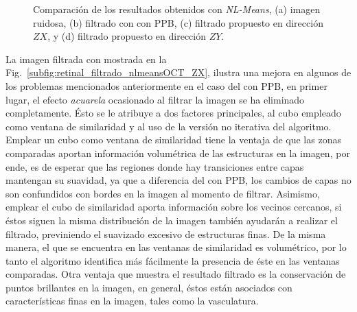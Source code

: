 \begin{figure}[ht!]
	\caption[Comparaciones del filtrado propuesto]{Comparación de los resultados obtenidos con \textit{NL-Means}, (a) imagen ruidosa, (b) filtrado con \nlmeans con PPB, (c) filtrado propuesto en dirección $ZX$, y (d) filtrado propuesto en dirección $ZY$.}
	\label{fig:retinal_ima_nlemans_OCT}
\end{figure}

La imagen filtrada con \nlmeansOCT mostrada en la Fig.~\ref{subfig:retinal_filtrado_nlmeansOCT_ZX}, ilustra una mejora en algunos de los problemas mencionados anteriormente en el caso del \nlmeans con PPB, en primer lugar, el efecto \textit{acuarela} ocasionado al filtrar la imagen se ha eliminado completamente. Ésto se le atribuye a dos factores principales, al cubo empleado como ventana de similaridad y al uso de la versión no iterativa del algoritmo. Emplear un cubo como ventana de similaridad tiene la ventaja de que las zonas comparadas aportan información volumétrica de las estructuras en la imagen, por ende, es de esperar que las regiones donde hay transiciones entre capas mantengan su suavidad, ya que a diferencia del \nlmeans con PPB, los cambios de capas no son confundidos con bordes en la imagen al momento de filtrar. Asimismo, emplear el cubo de similaridad aporta información sobre los vecinos cercanos, si éstos siguen la misma distribución de la imagen también ayudarán a realizar el filtrado, previniendo el suavizado excesivo de estructuras finas. De la misma manera, el \speckle que se encuentra en las ventanas de similaridad es volumétrico, por lo tanto el algoritmo identifica más fácilmente la presencia de éste en las ventanas comparadas. Otra ventaja que muestra el resultado filtrado es la conservación de puntos brillantes en la imagen, en general, éstos están asociados con características finas en la imagen, tales como la vasculatura. 

